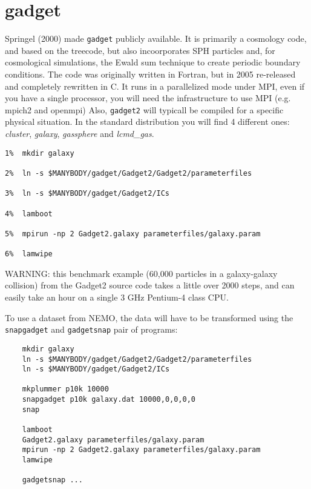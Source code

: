 {\section{gadget}

Springel (2000) made {\tt gadget} publicly available.
It is primarily a cosmology code, and based on the treecode, but also incoorporates 
SPH particles
and, for cosmological simulations, the Ewald sum technique to create periodic
boundary conditions. The code was originally written in Fortran, but in 2005 re-released
and completely rewritten in C. It runs in a parallelized mode under MPI, even if you 
have a single processor, you will need the infrastructure to use MPI
(e.g. mpich2 and openmpi)
Also,
{\tt gadget2} will typicall be compiled for a specific physical situation. In the
standard distribution you will find 4 different ones: 
{\it cluster}, {\it galaxy}, {\it gassphere} and 
{\it lcmd\_gas}.

\footnotesize\begin{verbatim}
1%  mkdir galaxy

2%  ln -s $MANYBODY/gadget/Gadget2/Gadget2/parameterfiles

3%  ln -s $MANYBODY/gadget/Gadget2/ICs

4%  lamboot

5%  mpirun -np 2 Gadget2.galaxy parameterfiles/galaxy.param

6%  lamwipe

\end{verbatim}\normalsize

WARNING: this benchmark example (60,000 particles in a galaxy-galaxy collision)
 from the Gadget2  source code takes a little
over 2000 steps,
and can easily take an hour on a single 3 GHz Pentium-4 class CPU. 

To use a dataset from NEMO, the data will have to be transformed using the
{\tt snapgadget} and {\tt gadgetsnap} pair of programs:

\footnotesize\begin{verbatim}
    mkdir galaxy
    ln -s $MANYBODY/gadget/Gadget2/Gadget2/parameterfiles
    ln -s $MANYBODY/gadget/Gadget2/ICs

    mkplummer p10k 10000
    snapgadget p10k galaxy.dat 10000,0,0,0,0
    snap

    lamboot
    Gadget2.galaxy parameterfiles/galaxy.param
    mpirun -np 2 Gadget2.galaxy parameterfiles/galaxy.param
    lamwipe

    gadgetsnap ...

\end{verbatim}\normalsize

}

